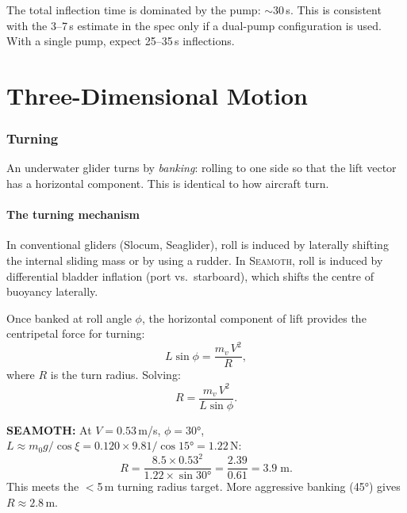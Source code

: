 \documentclass[11pt,a4paper]{article}
\newcommand{\seamoth}{\textsc{Seamoth}}
\newcommand{\note}[1]{\par\smallskip\noindent\colorbox{blue!8}{\parbox{\dimexpr\linewidth-2\fboxsep}{%
  \small\textbf{SEAMOTH:} #1}}\smallskip}
\begin{document}
The total inflection time is dominated by the pump: $\sim$30\,s.  This is consistent
with the 3--7\,s estimate in the spec only if a dual-pump configuration is used.
With a single pump, expect 25--35\,s inflections.


\part{Three-Dimensional Motion}

\section{Turning}
\label{sec:turning}

An underwater glider turns by \emph{banking}: rolling to one side so that the
lift vector has a horizontal component.  This is identical to how aircraft turn.

\subsection{The turning mechanism}

In conventional gliders (Slocum, Seaglider), roll is induced by laterally shifting
the internal sliding mass or by using a rudder.  In \seamoth{}, roll is induced by
differential bladder inflation (port vs.\ starboard), which shifts the centre of
buoyancy laterally.

Once banked at roll angle $\phi$, the horizontal component of lift provides the
centripetal force for turning:
\begin{equation}
  L\sin\phi = \frac{m_v\,V^2}{R},
  \label{eq:turn}
\end{equation}
where $R$ is the turn radius.  Solving:
\begin{equation}
  R = \frac{m_v\,V^2}{L\sin\phi}.
  \label{eq:turnrad}
\end{equation}

\note{At $V=0.53$\,m/s, $\phi=30°$, $L\approx m_0 g/\cos\xi = 0.120\times9.81/\cos15° = 1.22$\,N:
\[R = \frac{8.5\times0.53^2}{1.22\times\sin30°} = \frac{2.39}{0.61} = 3.9\;\text{m}.\]
This meets the $<$5\,m turning radius target.  More aggressive banking (45°) gives $R\approx2.8$\,m.}
\end{document}

